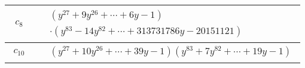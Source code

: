 \documentclass[1p]{elsarticle_modified}
\theoremstyle{definition}
\begin{document}
\begin{tabular}{m{50pt}|m{274pt}}
\hline $$\begin{aligned}c_{8}\end{aligned}$$&$\begin{aligned}
&(y^{27}+9 y^{26}+\cdots+6 y-1)\\
&\cdot(y^{83}-14 y^{82}+\cdots+313731786 y-20151121)
\end{aligned}$\\
\hline $$\begin{aligned}c_{10}\end{aligned}$$&$\begin{aligned}
&(y^{27}+10 y^{26}+\cdots+39 y-1)(y^{83}+7 y^{82}+\cdots+19 y-1)
\end{aligned}$\\
\hline
\end{tabular}
\vskip 2pc
\end{document}

